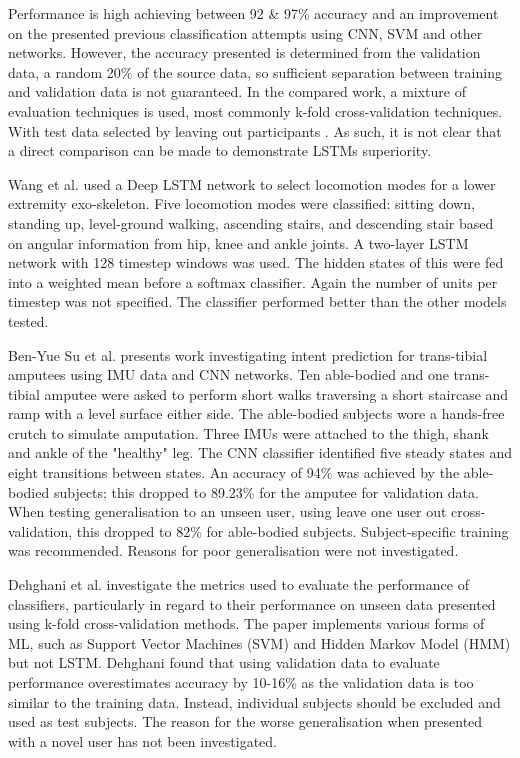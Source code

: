 \documentclass[sensors,article,submit,moreauthors,pdftex]{Definitions/mdpi}
\begin{document}
Performance is high achieving between 92 \& 97\% accuracy and an improvement on the presented previous classification attempts using CNN, SVM and other networks. However, the accuracy presented is determined from the validation data, a random 20\% of the source data, so sufficient separation between training and validation data is not guaranteed. In the compared work, a mixture of evaluation techniques is used, most commonly k-fold cross-validation techniques. With test data selected by leaving out participants \cite{Koller2018, Sprager2015}. As such, it is not clear that a direct comparison can be made to demonstrate LSTMs superiority.

Wang et al. used a Deep LSTM network to select locomotion modes for a lower extremity exo-skeleton\cite{Wang2018}. Five locomotion modes were classified: sitting down, standing up, level-ground walking, ascending stairs, and descending stair based on angular information from hip, knee and ankle joints. A two-layer LSTM network with 128 timestep windows was used. The hidden states of this were fed into a weighted mean before a softmax classifier. Again the number of units per timestep was not specified. The classifier performed better than the other models tested.

Ben-Yue Su et al. presents work investigating intent prediction for trans-tibial amputees using IMU data and CNN networks\cite{Su2019}. Ten able-bodied and one trans-tibial amputee were asked to perform short walks traversing a short staircase and ramp with a level surface either side. The able-bodied subjects wore a hands-free crutch to simulate amputation. Three IMUs were attached to the thigh, shank and ankle of the "healthy" leg. The CNN classifier identified five steady states and eight transitions between states. An accuracy of 94\% was achieved by the able-bodied subjects; this dropped to 89.23\% for the amputee for validation data. When testing generalisation to an unseen user, using leave one user out cross-validation, this dropped to 82\% for able-bodied subjects. Subject-specific training was recommended. Reasons for poor generalisation were not investigated.

Dehghani et al. investigate the metrics used to evaluate the performance of classifiers, particularly in regard to their performance on unseen data presented using k-fold cross-validation methods\cite{Dehghani2019}. The paper implements various forms of ML, such as Support Vector Machines (SVM) and Hidden Markov Model (HMM) but not LSTM. Dehghani found that using validation data to evaluate performance overestimates accuracy by 10-16\% as the validation data is too similar to the training data. Instead, individual subjects should be excluded and used as test subjects. The reason for the worse generalisation when presented with a novel user has not been investigated.
\end{document}
